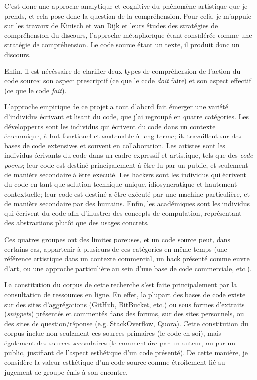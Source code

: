 \documentclass{article}
\begin{document}
C'est donc une approche analytique et cognitive du phénomène artistique que je prends, et cela pose donc la question de la compréhension. Pour celà, je m'appuie sur les travaux de Kintsch et van Dijk et leurs études des stratégies de compréhension du discours\cite{kintsch_toward_1978}, l'approche métaphorique étant considérée comme une stratégie de compréhension. Le code source étant un texte, il produit donc un discours.

Enfin, il est nécéssaire de clarifier deux types de compréhension de l'action du code source: son aspect prescriptif (ce que le code \emph{doit} faire) et son aspect effectif (ce que le code \emph{fait}).

L'approche empirique de ce projet a tout d'abord fait émerger une variété d'individus écrivant et lisant du code, que j'ai regroupé en quatre catégories\cite{hayes_cultures_2017}. Les développeurs sont les individus qui écrivent du code dans un contexte économique, à but fonctionel et soutenable à long-terme; ils travaillent sur des bases de code extensives et souvent en collaboration. Les artistes sont les individus écrivants du code dans un cadre expressif et artistique, tels que des \emph{code poems}; leur code est destiné principalement à être lu par un public, et seulement de manière secondaire à être exécuté. Les hackers sont les individus qui écrivent du code en tant que solution technique unique, idiosyncratique et hautement contextuelle; leur code est destiné à être exécuté par une machine particulière, et de manière secondaire par des humains. Enfin, les académiques sont les individus qui écrivent du code afin d'illustrer des concepts de computation, représentant des abstractions plutôt que des usages concrets.

Ces quatres groupes ont des limites poreuses, et un code source peut, dans certains cas, appartenir à plusieurs de ces catégories en même temps (une référence artistique dans un contexte commercial, un hack présenté comme euvre d'art, ou une approche particulière au sein d'une base de code commerciale, etc.).

La constitution du corpus de cette recherche s'est faite principalement par la consultation de ressources en ligne. En effet, la plupart des bases de code existe sur des sites d'aggrégations (GitHub, BitBucket, etc.) ou sous formes d'extraits (\emph{snippets}) présentés et commentés dans des forums, sur des sites personnels, ou des sites de question/réponse (e.g. StackOverflow, Quora). Cette constitution du corpus inclue non seulement ces sources primaires (le code en soi), mais également des sources secondaires (le commentaire par un auteur, ou par un public, justifiant de l'aspect esthétique d'un code présenté). De cette manière, je considère la valeur esthétique d'un code source comme étroitement lié au jugement de groupe émis à son encontre.
\end{document}
